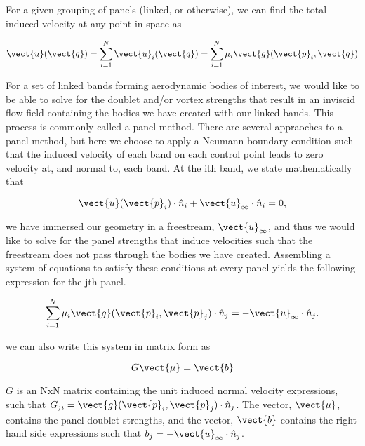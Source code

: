 For a given grouping of panels (linked, or otherwise),
we can find the total induced velocity at any point in space as

\begin{equation}
    \vect{u}(\vect{q}) = \sum_{i=1}^N \vect{u}_i(\vect{q})    =\sum_{i=1}^N \mu_i \vect{g}(\vect{p}_i,\vect{q})
\end{equation}

\noindent For a set of linked bands forming aerodynamic bodies of interest,
we would like to be able to solve for the doublet and/or vortex strengths that result in
an inviscid flow field containing the bodies we have created with our linked bands.
This process is commonly called a panel method.
There are several appraoches to a panel method, but here we choose to apply a
Neumann boundary condition such that the induced velocity of each band on each
control point leads to zero velocity at, and normal to, each band.
At the ith band, we state mathematically that

\begin{equation}
    \vect{u}(\vect{p}_i) \cdot \hat{n}_i + \vect{u}_\infty \cdot \hat{n}_i = 0,
\end{equation}

\where we have immersed our geometry in a freestream, \(\vect{u}_\infty\),
and thus we would like to solve for the panel strengths that induce velocities such that
the freestream does not pass through the bodies we have created.
Assembling a system of equations to satisfy these conditions at every panel yields the
following expression for the jth panel.

\begin{equation}
    \sum_{i=1}^N \mu_i \vect{g}(\vect{p}_i,\vect{p}_j) \cdot \hat{n}_j = - \vect{u}_\infty \cdot \hat{n}_j.
\end{equation}

\noindent we can also write this system in matrix form as

\begin{equation}
    G \vect{\mu} = \vect{b}
\end{equation}

\where \(G\) is an NxN matrix containing the unit induced normal velocity expressions,
such that \(G_{ji} = \vect{g}(\vect{p}_i, \vect{p}_j) \cdot \hat{n}_j \).
The vector, \(\vect{\mu}\), contains the panel doublet strengths, and the vector,
\(\vect{b}\) contains the right hand side expressions such that
\(b_j = -\vect{u}_\infty \cdot \hat{n}_j \).


